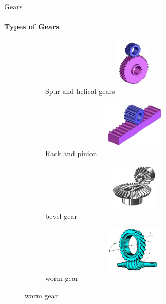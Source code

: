 \documentclass[aspectratio=169]{beamer}
\begin{document}
\begin{frame}[t]{Gears}
    \framesubtitle{Types of Gears}
    \vspace{-0.6cm}
    \begin{figure}[H]
        \begin{subfigure}{0.49\textwidth}
            \centering\includegraphics[height=2.2cm,width=1\textwidth,keepaspectratio]{gear_1.png}
            \caption{Spur and helical gears}
        \end{subfigure}
        \begin{subfigure}{0.49\textwidth}
            \centering\includegraphics[height=2.2cm,width=1\textwidth,keepaspectratio]{gear_3.png}
            \caption{Rack and pinion}
            \label{fig:gear_3.png}
        \end{subfigure}
    
        \begin{subfigure}{0.49\textwidth}
            \centering\includegraphics[height=2.2cm,width=1\textwidth,keepaspectratio]{bevel_gear_1.png}
            \caption{bevel gear}
            \label{fig:bevel_gear_1.png}
        \end{subfigure}
        \begin{subfigure}{0.49\textwidth}
            \centering\includegraphics[height=2.2cm,width=1\textwidth,keepaspectratio]{gear_worm_1.png}
            \caption{worm gear}
            \label{fig:gear_worm_1.png}
        \end{subfigure}
    \end{figure}
\end{frame}
\end{document}
